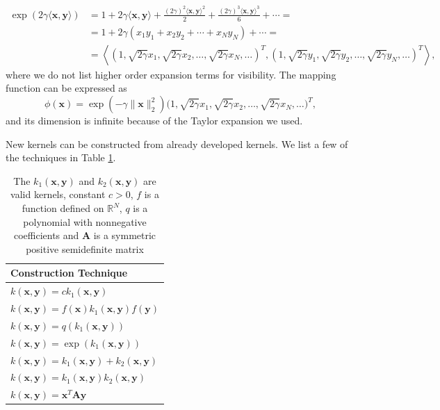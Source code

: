 \documentclass[11pt,american]{book} %
\theoremstyle{plain}
\theoremstyle{definition}
\begin{document}
\begin{equation}
	\begin{aligned}
		\exp(2\gamma \langle \bm{x}, \bm{y} \rangle ) &= 1 + 2\gamma \langle \bm{x}, \bm{y} \rangle + \frac{(2\gamma)^2 \langle \bm{x}, \bm{y} \rangle^2}{2} + \frac{(2\gamma)^3 \langle \bm{x}, \bm{y} \rangle^3}{6} + \cdots = \\
		&= 1 + 2\gamma (x_1 y_1 + x_2 y_2 + \cdots + x_N y_N)  + \cdots = \\
		&= \left\langle( 1, \sqrt{2\gamma} x_1, \sqrt{2\gamma} x_2, \dots, \sqrt{2\gamma} x_N, \dots )^T, ( 1, \sqrt{2\gamma} y_1, \sqrt{2\gamma} y_2, \dots, \sqrt{2\gamma} y_N, \dots )^T \right\rangle,
	\end{aligned}
\end{equation}
where we do not list higher order expansion terms for visibility. The mapping function can be expressed as
\begin{equation}
	\phi(\bm{x}) = \exp(-\gamma \|\bm{x} \|^2_2)\Big( 1, \sqrt{2\gamma} x_1, \sqrt{2\gamma} x_2, \dots, \sqrt{2\gamma} x_N, \dots \Big)^T,
\end{equation}
and its dimension is infinite because of the Taylor expansion we used.

New kernels can be constructed from already developed kernels. We list a few of the techniques in Table \ref{techniques}.

\begin{table}[H]
	\centering
	\begin{tabular}{l} 
		\hline
		Construction Technique  \\ 
		\hline
		$k(\bm{x}, \bm{y}) = c k_1(\bm{x}, \bm{y})$   \\
		$k(\bm{x}, \bm{y}) = f(\bm{x})k_1(\bm{x}, \bm{y}) f(\bm{y})$  \\
		$k(\bm{x}, \bm{y}) = q(k_1(\bm{x}, \bm{y}))$   \\
		$k(\bm{x}, \bm{y}) = \exp(k_1(\bm{x}, \bm{y}))$    \\
		$k(\bm{x}, \bm{y}) = k_1(\bm{x}, \bm{y}) + k_2(\bm{x}, \bm{y})$  \\
		$k(\bm{x}, \bm{y}) = k_1(\bm{x}, \bm{y}) k_2(\bm{x}, \bm{y})$\\
		$k(\bm{x}, \bm{y}) = \bm{x}^T \bm{A} \bm{y}$                     \\
		\hline
	\end{tabular}
	\caption{The $k_1(\bm{x}, \bm{y})$ and $k_2(\bm{x}, \bm{y})$ are valid kernels, constant $c>0$, $f$ is a function defined on $\mathbb{R}^N$, $q$ is a polynomial with nonnegative coefficients and $\bm{A}$ is a symmetric positive semidefinite matrix}
	\label{techniques}
\end{table}
\end{document}
